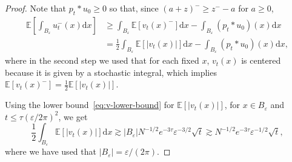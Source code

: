\documentclass[a4paper,12pt]{article}
\newcommand{\mathd}{\mathrm{d}}
\newcommand{\E}{\mathbb{E}}
\begin{document}
\begin{proof}
    Note that $p_t \ast u_0 \geq 0$ so that, since $(a+z)^{-} \geq z^- - a$ for $a \geq 0$,
\begin{align*}
\mathbb{E}\left[\int_{B_\varepsilon} u_t^-(x) \mathd x \right] 
    &\geq \int_{B_\varepsilon}  \mathbb{E}[v_t(x)^-]\mathd x - \int_{B_\varepsilon}  (p_t \ast u_0)(x)\mathd x  \\
    &= \frac{1}{2}\int_{B_\varepsilon}  \mathbb{E}[|v_t(x)|]\mathd x - \int_{B_\varepsilon}  (p_t \ast u_0)(x)\mathd x,
\end{align*}
where in the second step we used that for each fixed $x$, $v_t(x)$ is centered because it is given by a stochastic integral, which implies $\mathbb{E}[v_t(x)^-] = \frac{1}{2} \mathbb{E}[|v_t(x)|]$.

Using the lower bound~\eqref{eq:v-lower-bound} for $\E[|v_t(x)|]$, for $x \in B_\varepsilon$ and $t \leq \tau (\varepsilon/2\pi)^2$,  we get
\[
\frac{1}{2}\int_{B_\varepsilon}  \mathbb{E}[|v_t(x)|]\mathd x \gtrsim |B_\varepsilon| N^{-1/2} e^{-3\tau} \varepsilon^{-3/2} \sqrt{t} \gtrsim  N^{-1/2} e^{-3\tau} \varepsilon^{-1/2} \sqrt{t},
\]
where we have used that $|B_\varepsilon| = \varepsilon/(2 \pi)$.


\end{proof}
\end{document}
